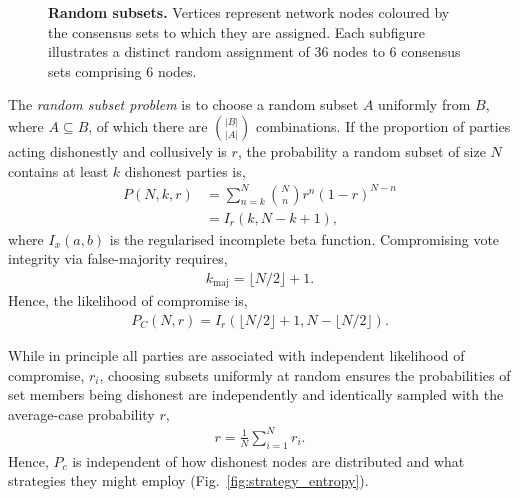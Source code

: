 
\begin{figure}[!htb]
	\centering
	\resizebox{0.5\columnwidth}{!}{}
	\caption{\textbf{Random subsets.} Vertices represent network nodes coloured by the consensus sets to which they are assigned. Each subfigure illustrates a distinct random assignment of 36 nodes to 6 consensus sets comprising 6 nodes.} \label{fig:random_subsets}
\end{figure}

The \emph{random subset problem} is to choose a random subset $A$ uniformly from $B$, where $A\subseteq B$, of which there are $\binom{|B|}{|A|}$ combinations. If the proportion of parties acting dishonestly and collusively is $r$, the probability a random subset of size $N$ contains at least $k$ dishonest parties is,
\begin{align} \label{eq:rss_probability}
	P(N,k,r) &= \sum_{n=k}^{N} \binom{N}{n} {r}^n (1-r)^{N-n} \nonumber \\
         &= I_r(k,N-k+1),
\end{align}
where $I_x(a,b)$ is the regularised incomplete beta function. Compromising vote integrity via false-majority requires,
\begin{align}
	k_\mathrm{maj} = \lfloor N/2 \rfloor + 1.
\end{align}
Hence, the likelihood of compromise is,
\begin{align}
	P_C(N,r) = I_r(\lfloor N/2 \rfloor + 1,N-\lfloor N/2 \rfloor).
\end{align}

While in principle all parties are associated with independent likelihood of compromise, $r_i$, choosing subsets uniformly at random ensures the probabilities of set members being dishonest are independently and identically sampled with the average-case probability $r$,
\begin{align} \label{eq:av_r_uniform}
	r = \frac{1}{N} \sum_{i=1}^N r_i.
\end{align}
Hence, $P_c$ is independent of how dishonest nodes are distributed and what strategies they might employ (Fig.~\ref{fig:strategy_entropy}).

